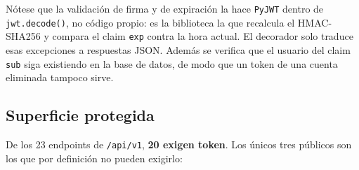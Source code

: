 \documentclass[11pt,letterpaper]{article}
\begin{document}
\begin{nota}
Nótese que la validación de firma y de expiración la hace \texttt{PyJWT} dentro de
\texttt{jwt.decode()}, no código propio: es la biblioteca la que recalcula el HMAC-SHA256 y
compara el claim \texttt{exp} contra la hora actual. El decorador solo traduce esas
excepciones a respuestas JSON. Además se verifica que el usuario del claim \texttt{sub}
siga existiendo en la base de datos, de modo que un token de una cuenta eliminada tampoco
sirve.
\end{nota}

\subsection{Superficie protegida}

De los 23 endpoints de \texttt{/api/v1}, \textbf{20 exigen token}. Los únicos tres públicos
son los que por definición no pueden exigirlo:
\end{document}
